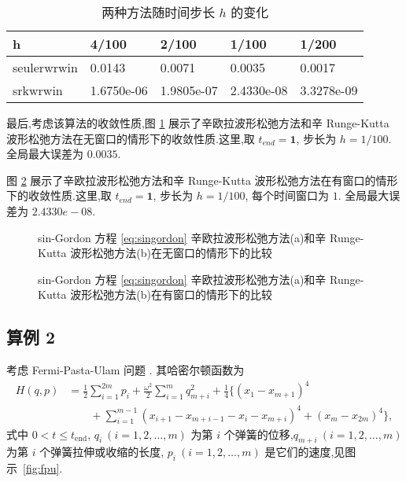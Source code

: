 \begin{table}[h!]
    \begin{center}
    \caption{两种方法随时间步长 $h$ 的变化}
    \label{tbl:order}
    \begin{tabularx}{\linewidth}{XXXXX}
        \toprule[1.5pt]
        h & 4/100 & 2/100 & 1/100 & 1/200\\
        \midrule[1pt]
        seulerwrwin & 0.0143 &0.0071 &0.0035 &0.0017\\
        srkwrwin    & 1.6750e-06 & 1.9805e-07 & 2.4330e-08 & 3.3278e-09\\
        \bottomrule[1.5pt]
    \end{tabularx}
    \end{center}
  \end{table}

最后,考虑该算法的收敛性质,图 \ref{fig:ex1err} 展示了辛欧拉波形松弛方法和辛 Runge-Kutta 波形松弛方法在无窗口的情形下的收敛性质.这里,取 $t_{end} =\textbf{1}$, 步长为 $h=1/100$. 全局最大误差为 $0.0035$.

图 \ref{fig:ex1winerr} 展示了辛欧拉波形松弛方法和辛 Runge-Kutta 波形松弛方法在有窗口的情形下的收敛性质.这里,取 $t_{end} =\textbf{1}$, 步长为 $h=1/100$, 每个时间窗口为 $1$. 全局最大误差为 $2.4330e-08$.

\begin{figure}[h!]
  \centering
  \caption{sin-Gordon 方程 \eqref{eq:singordon} 辛欧拉波形松弛方法(a)和辛 Runge-Kutta 波形松弛方法(b)在无窗口的情形下的比较}
  \label{fig:ex1err}
\end{figure}

\begin{figure}[h!]
  \centering
  \caption{sin-Gordon 方程 \eqref{eq:singordon} 辛欧拉波形松弛方法(a)和辛 Runge-Kutta 波形松弛方法(b)在有窗口的情形下的比较}
  \label{fig:ex1winerr}
\end{figure}

\subsection*{算例 2}
考虑 Fermi-Pasta-Ulam 问题 \cite{hairer2006geometric}. 其哈密尔顿函数为
\begin{equation*}
  \begin{aligned}
    H(q,p) &= \displaystyle{\frac{1}{2}} \sum_{i=1}^{2m} p_i +
    \displaystyle{\frac{\omega^2}{2}} \sum_{i=1}^{m} q_{m+i}^2 +
    \displaystyle{\frac{1}{4}}  \{ (x_1 - x_{m+1})^4 \\
    & \qquad + \sum_{i=1}^{m-1} (x_{i+1} - x_{m+i-1} - x_i - x_{m+i})^4 + (x_{m}
    - x_{2m})^4\},
  \end{aligned}
\end{equation*}
式中 $0<t\leq t_{\text{end}}$, $q_i~(i=1,2,\ldots,m)$ 为第 $i$ 个弹簧的位移,$q_{m+i}~(i=1,2,\ldots,m)$ 为第 $i$ 个弹簧拉伸或收缩的长度, $p_i~(i=1,2,\ldots,m)$ 是它们的速度,见图示~\ref{fig:fpu}.

